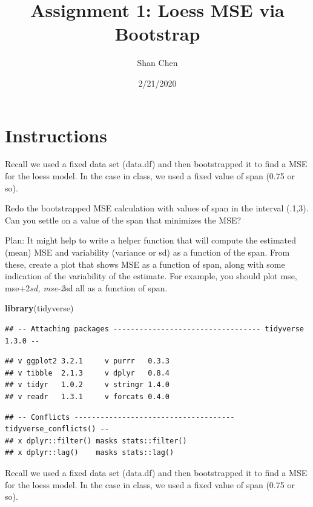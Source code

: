 \documentclass[]{article}
\title{Assignment 1: Loess MSE via Bootstrap}
\author{Shan Chen}
\date{2/21/2020}
\newenvironment{Shaded}{\begin{snugshade}}{\end{snugshade}}
\newcommand{\KeywordTok}[1]{\textcolor[rgb]{0.13,0.29,0.53}{\textbf{#1}}}
\newcommand{\NormalTok}[1]{#1}
\begin{document}
\maketitle

\hypertarget{instructions}{%
\section{Instructions}\label{instructions}}

Recall we used a fixed data set (data.df) and then bootstrapped it to
find a MSE for the loess model. In the case in class, we used a fixed
value of span (0.75 or so).

Redo the bootstrapped MSE calculation with values of span in the
interval (.1,3). Can you settle on a value of the span that minimizes
the MSE?

Plan: It might help to write a helper function that will compute the
estimated (mean) MSE and variability (variance or sd) as a function of
the span. From these, create a plot that shows MSE as a function of
span, along with some indication of the variability of the estimate. For
example, you should plot mse, mse+2\emph{sd, mse-2}sd all as a function
of span.

\begin{Shaded}
\begin{Highlighting}[]
\KeywordTok{library}\NormalTok{(tidyverse)}
\end{Highlighting}
\end{Shaded}

\begin{verbatim}
## -- Attaching packages ---------------------------------- tidyverse 1.3.0 --
\end{verbatim}

\begin{verbatim}
## v ggplot2 3.2.1     v purrr   0.3.3
## v tibble  2.1.3     v dplyr   0.8.4
## v tidyr   1.0.2     v stringr 1.4.0
## v readr   1.3.1     v forcats 0.4.0
\end{verbatim}

\begin{verbatim}
## -- Conflicts ------------------------------------- tidyverse_conflicts() --
## x dplyr::filter() masks stats::filter()
## x dplyr::lag()    masks stats::lag()
\end{verbatim}

Recall we used a fixed data set (data.df) and then bootstrapped it to
find a MSE for the loess model. In the case in class, we used a fixed
value of span (0.75 or so).
\end{document}
